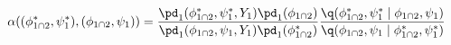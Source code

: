 \begin{equation}
  \alpha((\phi_{1 \cap 2}^{*}, \psi_{1}^{*}), (\phi_{1 \cap 2}, \psi_{1})) = 
  \frac {
    \pd_{1}(\phi_{1 \cap 2}^{*}, \psi_{1}^{*}, Y_{1})
    \pd_{1}(\phi_{1 \cap 2})
  } {
    \pd_{1}(\phi_{1 \cap 2}, \psi_{1}, Y_{1})
    \pd_{1}(\phi_{1 \cap 2}^{*})
  }
  \frac {
    \q(\phi_{1 \cap 2}^{*}, \psi_{1}^{*} \mid \phi_{1 \cap 2}, \psi_{1})
  } {
    \q(\phi_{1 \cap 2}, \psi_{1} \mid \phi_{1 \cap 2}^{*}, \psi_{1}^{*})
  }
  \label{eqn:stage-one-acceptance-probability}
\end{equation}